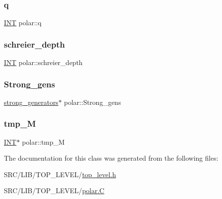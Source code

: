\subsubsection{\texorpdfstring{q}{q}}
{\footnotesize\ttfamily \mbox{\hyperlink{galois_8h_a09fddde158a3a20bd2dcadb609de11dc}{I\+NT}} polar\+::q}

\mbox{\label{classpolar_a60ff5ac445ba413eecd4aaea181ad1c2}} 
\subsubsection{\texorpdfstring{schreier\+\_\+depth}{schreier\_depth}}
{\footnotesize\ttfamily \mbox{\hyperlink{galois_8h_a09fddde158a3a20bd2dcadb609de11dc}{I\+NT}} polar\+::schreier\+\_\+depth}

\mbox{\label{classpolar_aa8a062b61564a2d8c859e8ea9f54efa9}} 
\subsubsection{\texorpdfstring{Strong\+\_\+gens}{Strong\_gens}}
{\footnotesize\ttfamily \mbox{\hyperlink{classstrong__generators}{strong\+\_\+generators}}$\ast$ polar\+::\+Strong\+\_\+gens}

\mbox{\label{classpolar_a448b162510d88e48d71557da45b48a5f}} 
\subsubsection{\texorpdfstring{tmp\+\_\+M}{tmp\_M}}
{\footnotesize\ttfamily \mbox{\hyperlink{galois_8h_a09fddde158a3a20bd2dcadb609de11dc}{I\+NT}}$\ast$ polar\+::tmp\+\_\+M}



The documentation for this class was generated from the following files\+:\begin{DoxyCompactItemize}
\item 
S\+R\+C/\+L\+I\+B/\+T\+O\+P\+\_\+\+L\+E\+V\+E\+L/\mbox{\hyperlink{top__level_8h}{top\+\_\+level.\+h}}\item 
S\+R\+C/\+L\+I\+B/\+T\+O\+P\+\_\+\+L\+E\+V\+E\+L/\mbox{\hyperlink{_l_i_b_2_t_o_p___l_e_v_e_l_2polar_8_c}{polar.\+C}}\end{DoxyCompactItemize}
